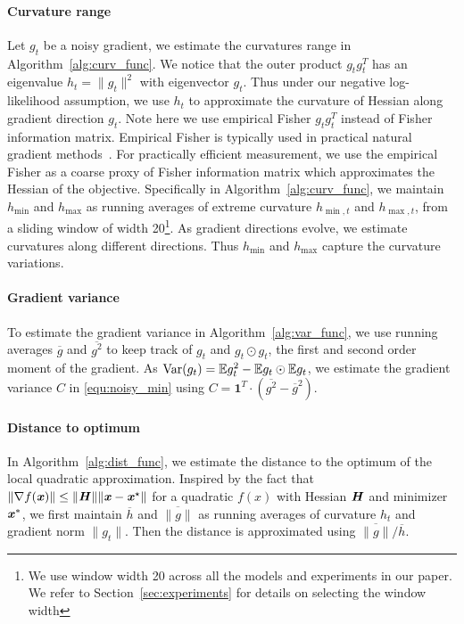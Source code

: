 \paragraph{Curvature range}
Let $g_t$ be a noisy gradient, we estimate the curvatures range in Algorithm~\ref{alg:curv_func}. We notice that the outer product $g_tg_t^T$ has an eigenvalue $h_t=\| g_t \|^2$ with eigenvector $g_t$. Thus under our negative log-likelihood assumption, we use $h_t$ to approximate the curvature of Hessian along gradient direction $g_t$. Note here we use empirical Fisher $g_tg_t^T$ instead of Fisher information matrix. Empirical Fisher is typically used in practical natural gradient methods~\citep{martens2014new, roux2008topmoumoute, duchi2011adaptive}. For practically efficient measurement, we use the empirical Fisher as a coarse proxy of Fisher information matrix which approximates the Hessian of the objective. 
Specifically in Algorithm~\ref{alg:curv_func}, we maintain $h_{\min}$ and $h_{\max}$ as running averages of extreme curvature $h_{\min, t}$ and $h_{\max, t}$, from a sliding window of width 20\footnote{We use window width 20 across all the models and experiments in our paper. We refer to Section~\ref{sec:experiments} for details on selecting the window width}.
As gradient directions evolve, we estimate curvatures along different directions. Thus $h_{\min}$ and $h_{\max}$ capture the curvature variations.

\paragraph{Gradient variance}
To estimate the gradient variance in Algorithm~\ref{alg:var_func}, 
we use running averages $\overline{g}$ and $\overline{g^2}$ to keep track of $g_t$ and $g_t \odot g_t$, the first and second order moment of the gradient. 
As $\mathrm{Var}(g_t) = \mathbb{E}{g_t^2} - \mathbb{E}{g_t} \odot \mathbb{E}{g_t}$, we estimate the gradient variance $C$ in \eqref{equ:noisy_min} using $C=\bm{1}^T\!\!\cdot(\overline{g^2} - \overline{g}^2)$. %

\paragraph{Distance to optimum}
In Algorithm~\ref{alg:dist_func}, we estimate the distance to the optimum of the local quadratic approximation.
Inspired by the fact that $\| \nabla f(\bm{\mathit{x}}) \| \leq \| \bm{\mathit{H}} \| \| \bm{\mathit{x}} - \bm{\mathit{x}}^{\star}\|$ for a quadratic $f(x)$ with Hessian $\bm{\mathit{H}}$ and minimizer $\bm{\mathit{x}}^{*}$,  
we first maintain $\overline{h}$ and $\overline{\|g\|}$ as running averages of curvature $h_t$ and gradient norm $\| g_t \|$. Then the distance is approximated using $\overline{\|g\|} / \overline{h}$. %

